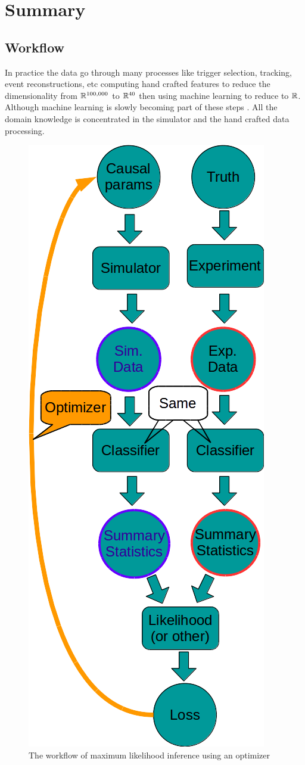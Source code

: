 




\section{Summary} %
\label{sec:summary}


\subsection{Workflow} %
\label{sub:workflow}


In practice the data go through many processes like trigger selection, tracking, event reconstructions, etc computing hand crafted features to reduce the dimensionality from $\mathbb{R}^{100,000}$ to $\mathbb{R}^{40}$ then using machine learning to reduce to $\mathbb{R}$.
Although machine learning is slowly becoming part of these steps \needcite.
All the domain knowledge is concentrated in the simulator and the hand crafted data processing.


\begin{figure}[htb]
    \centering
    \includegraphics[width=0.5\linewidth]{workflow}
    \caption{The workflow of maximum likelihood inference using an optimizer}
    \label{fig:workflow}
\end{figure}


